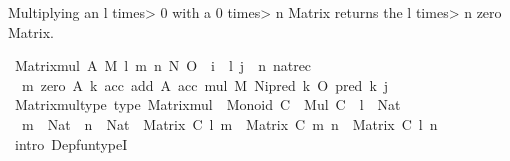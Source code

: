 \begin{isabellebody}
{\isafolddocument}%
%
\isadelimdocument
%
\endisadelimdocument
%
\begin{isamarkuptext}%
Multiplying an l \<times> 0 with a 0 \<times> n Matrix returns the l \<times> n zero Matrix.%
\end{isamarkuptext}\isamarkuptrue%
\isamarkupfalse%
\ {\isachardoublequoteopen}Matrix{\isacharunderscore}{\kern0pt}mul\ A\ M\ l\ m\ n\ N\ O\ {\isasymequiv}\ {\isasymlambda}i\ {\isasymin}\ {\isacharbrackleft}{\kern0pt}{}{\isacharcomma}{\kern0pt}{\isasymdots}{\isacharcomma}{\kern0pt}l{\isacharbrackleft}{\kern0pt}{\isachardot}{\kern0pt}\ {\isasymlambda}j\ {\isasymin}\ {\isacharbrackleft}{\kern0pt}{}{\isacharcomma}{\kern0pt}{\isasymdots}{\isacharcomma}{\kern0pt}n{\isacharbrackleft}{\kern0pt}{\isachardot}{\kern0pt}\ nat{\isacharunderscore}{\kern0pt}rec{\isacharprime}{\kern0pt}\isanewline
\ \ m\ {\isacharparenleft}{\kern0pt}zero\ A{\isacharparenright}{\kern0pt}\ {\isacharparenleft}{\kern0pt}{\isasymlambda}k\ acc{\isachardot}{\kern0pt}\ add\ A\ acc\ {\isacharparenleft}{\kern0pt}mul\ M\ {\isacharparenleft}{\kern0pt}N{\isacharbackquote}{\kern0pt}i{\isacharbackquote}{\kern0pt}{\isacharparenleft}{\kern0pt}pred\ k{\isacharparenright}{\kern0pt}{\isacharparenright}{\kern0pt}\ {\isacharparenleft}{\kern0pt}O\ {\isacharbackquote}{\kern0pt}{\isacharparenleft}{\kern0pt}pred\ k{\isacharparenright}{\kern0pt}\ {\isacharbackquote}{\kern0pt}j{\isacharparenright}{\kern0pt}{\isacharparenright}{\kern0pt}{\isacharparenright}{\kern0pt}{\isachardoublequoteclose}\isanewline
\isanewline
\isanewline
{}\isamarkupfalse%
\ Matrix{\isacharunderscore}{\kern0pt}mul{\isacharunderscore}{\kern0pt}type\ {\isacharbrackleft}{\kern0pt}type{\isacharbrackright}{\kern0pt}{\isacharcolon}{\kern0pt}\ {\isachardoublequoteopen}Matrix{\isacharunderscore}{\kern0pt}mul\ {\isacharcolon}{\kern0pt}\ Monoid\ C\ {\isasymRightarrow}\ Mul\ C\ {\isasymRightarrow}\ {\isacharparenleft}{\kern0pt}l\ {\isacharcolon}{\kern0pt}\ Nat{\isacharparenright}{\kern0pt}\ {\isasymRightarrow}\isanewline
\ \ {\isacharparenleft}{\kern0pt}m\ {\isacharcolon}{\kern0pt}\ Nat{\isacharparenright}{\kern0pt}\ {\isasymRightarrow}\ {\isacharparenleft}{\kern0pt}n\ {\isacharcolon}{\kern0pt}\ Nat{\isacharparenright}{\kern0pt}\ {\isasymRightarrow}\ Matrix\ C\ l\ m\ {\isasymRightarrow}\ Matrix\ C\ m\ n\ {\isasymRightarrow}\ Matrix\ C\ l\ n{\isachardoublequoteclose}\isanewline
%
\isadelimproof
%
\endisadelimproof
%
\isatagproof
{}\isamarkupfalse%
\ {\isacharparenleft}{\kern0pt}intro\ Dep{\isacharunderscore}{\kern0pt}fun{\isacharunderscore}{\kern0pt}typeI{\isacharparenright}{\kern0pt}\isanewline

\end{isabellebody}
